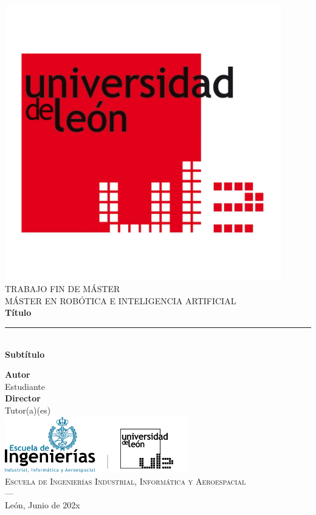 \begin{titlepage}
\newlength{\centeroffset}
\setlength{\centeroffset}{-0.5\oddsidemargin}
\addtolength{\centeroffset}{0.5\evensidemargin}
\thispagestyle{empty}

\noindent\hspace*{\centeroffset}\begin{minipage}{\textwidth}

\centering
\includegraphics[width=0.9\textwidth]{logos/logo_ule.jpg}\\[1.4cm]

\textsc{ \Large TRABAJO FIN DE MÁSTER\\[0.2cm]}
\textsc{ MÁSTER EN ROBÓTICA E INTELIGENCIA ARTIFICIAL}\\[1cm]

{\Huge\bfseries Título \\}
\noindent\rule[-1ex]{\textwidth}{3pt}\\[3.5ex]
{\large\bfseries Subtítulo }
\end{minipage}

\vspace{2.5cm}
\noindent\hspace*{\centeroffset}
\begin{minipage}{\textwidth}
\centering

\textbf{Autor}\\ {Estudiante}\\[2.5ex]
\textbf{Director}\\ {Tutor(a)(es)}\\[2cm]
\includegraphics[width=0.6\textwidth]{logos/eiiia_logo.png}\\[0.5cm]
\textsc{Escuela de Ingenierías Industrial, Informática y Aeroespacial}\\
\textsc{---}\\
León, Junio de 202x
\end{minipage}
\end{titlepage}
